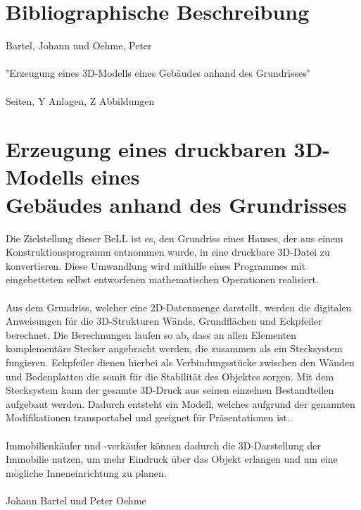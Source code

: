 \section*{Bibliographische Beschreibung}
Bartel, Johann und Oehme, Peter \\ \\
"Erzeugung eines 3D-Modells eines Gebäudes anhand des Grundrisses" \\ \\
 \pageref{LastPage} Seiten, Y Anlagen, Z Abbildungen
 
  \newpage
 
\section*{Erzeugung eines druckbaren 3D-Modells eines \\ Gebäudes anhand des Grundrisses}
 	
 
 Die Zielstellung dieser BeLL ist es, den Grundriss eines Hauses, der aus einem Konstruktionsprogramm entnommen wurde, in eine druckbare 3D-Datei zu konvertieren.
 Diese Umwandlung wird mithilfe eines Programmes mit eingebetteten selbst entworfenen mathematischen Operationen realisiert.\\\\
 Aus dem Grundriss, welcher eine 2D-Datenmenge darstellt, werden die digitalen Anweisungen für die 3D-Strukturen Wände, Grundflächen und Eckpfeiler berechnet. 
 Die Berechnungen laufen so ab, dass an allen Elementen komplementäre Stecker angebracht werden, die zusammen als ein Stecksystem fungieren. 
 Eckpfeiler dienen hierbei als Verbindungsstücke zwischen den Wänden und Bodenplatten die somit für die Stabilität des Objektes  sorgen. 
 Mit dem Stecksystem kann der gesamte 3D-Druck aus seinen einzelnen Bestandteilen aufgebaut werden. 
 Dadurch entsteht ein Modell, welches aufgrund der genannten Modifikationen transportabel und geeignet für Präsentationen ist.\\\\
 Immobilienkäufer und -verkäufer können dadurch die 3D-Darstellung der Immobilie  nutzen, um mehr Eindruck über das Objekt erlangen und um eine mögliche Inneneinrichtung zu planen.\\\\
 Johann Bartel und Peter Oehme
